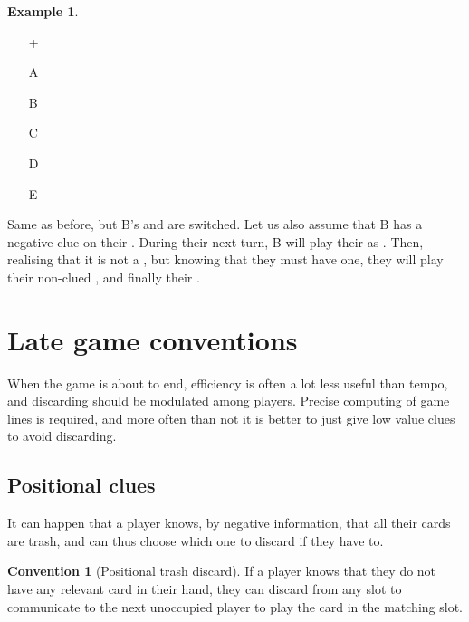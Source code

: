 \documentclass[a4paper]{article}
\theoremstyle{plain}
\theoremstyle{definition}
\newtheorem{example}[theorem]{Example}
\newtheorem{convention}[theorem]{Convention}
\begin{document}
\begin{example}	\hfill \\
	\begin{minipage}{0.45\textwidth}
		\begin{itemize}
			\item[\Large +]      
			\item[\Large A]    
			\item[\Large B]    
			\item[\Large C]    
			\item[\Large D]    
			\item[\Large E]    
		\end{itemize}
	\end{minipage}%
	\begin{minipage}{0.55\textwidth}		
		Same as before, but B's  and  are switched. Let us also assume that B has a negative  clue on their . During their next turn, B will play their  as . Then, realising that it is not a , but knowing that they must have one, they will play their non-clued , and finally their .
	\end{minipage}
\end{example} \vspace{0.15 cm}

\section{Late game conventions}
\label{sec:late-game}

When the game is about to end, efficiency is often a lot less useful than tempo, and discarding should be modulated among players. Precise computing of game lines is required, and more often than not it is better to just give low value clues to avoid discarding. 

\subsection{Positional clues}

It can happen that a player knows, by negative information, that all their cards are trash, and can thus choose which one to discard if they have to.

\begin{convention}[Positional trash discard]
	If a player knows that they do not have any relevant card in their hand, they can discard from any slot to communicate to the next unoccupied player to play the card in the matching slot.
\end{convention}
\end{document}
